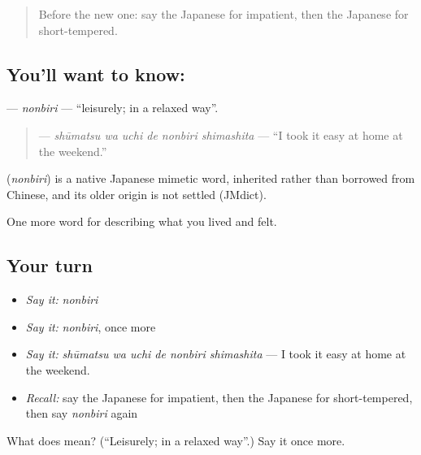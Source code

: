 \begin{quote}
Before the new one: say the Japanese for impatient, then the Japanese for short-tempered.
\end{quote}

\subsection*{You'll want to know: }
\textbf{} — \emph{nonbiri} — \textquotedblleft{}leisurely; in a relaxed way\textquotedblright{}.

\begin{quote}
\textbf{  } — \emph{shūmatsu wa uchi de nonbiri shimashita} — \textquotedblleft{}I took it easy at home at the weekend.\textquotedblright{}
\end{quote}

\begin{cousinweb}
\textbf{} (\emph{nonbiri}) is a native Japanese mimetic word, inherited rather than borrowed from Chinese, and its older origin is not settled (JMdict).
\end{cousinweb}

\begin{grammarlens}[title={What you've built}]
One more word for describing what you lived and felt.
\end{grammarlens}

\subsection*{Your turn}
\begin{itemize}
\raggedright
  \item \emph{Say it:} \emph{nonbiri}
  \item \emph{Say it:} \emph{nonbiri}, once more
  \item \emph{Say it:} \emph{shūmatsu wa uchi de nonbiri shimashita} — I took it easy at home at the weekend.
  \item \emph{Recall:} say the Japanese for impatient, then the Japanese for short-tempered, then say \emph{nonbiri} again
\end{itemize}

\begin{tcolorbox}[breakable,colback=teal!4,colframe=teal!35!black,title={Before you move on}]
What does  mean? (\textquotedblleft{}Leisurely; in a relaxed way\textquotedblright{}.) Say it once more.
\end{tcolorbox}
